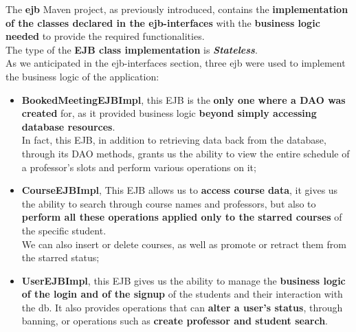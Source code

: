 The \textbf{ejb} Maven project, as previously introduced, contains the \textbf{implementation of the classes declared in the ejb-interfaces} with the \textbf{business logic needed} to provide the required functionalities.\\
The type of the \textbf{EJB class implementation} is \textbf{\textit{Stateless}}.\\
As we anticipated in the ejb-interfaces section, three ejb were used to implement the business logic of the application:
\begin{itemize}
    \item \textbf{BookedMeetingEJBImpl}, this EJB is the \textbf{only one where a DAO was created} for, as it provided business logic \textbf{beyond simply accessing database resources}.\\
    In fact, this EJB, in addition to retrieving data back from the database, through its DAO methods, grants us the ability to view the entire schedule of a professor's slots and perform various operations on it;
    \item \textbf{CourseEJBImpl}, This EJB allows us to \textbf{access course data}, it gives us the ability to search through course names and professors, but also to \textbf{perform all these operations applied only to the starred courses} of the specific student.\\
    We can also insert or delete courses, as well as promote or retract them from the starred status;
    \item \textbf{UserEJBImpl}, this EJB gives us the ability to manage the \textbf{business logic of the login and of the signup} of the students and their interaction with the db.
    It also provides operations that can \textbf{alter a user's status}, through banning, or operations such as \textbf{create professor and student search}.
\end{itemize}
\newpage